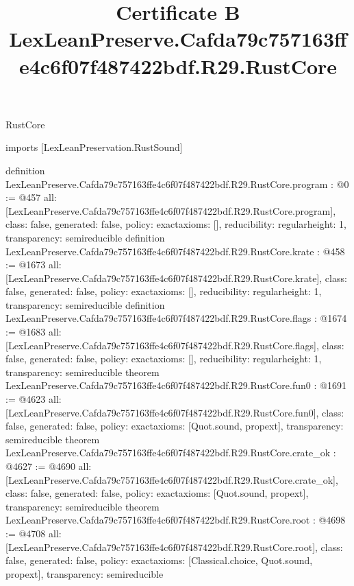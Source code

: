 \begin{lexlean}{RustCore}
\title{Certificate B LexLeanPreserve.Cafda79c757163ffe4c6f07f487422bdf.R29.RustCore}
\begin{coremodule}
imports [LexLeanPreservation.RustSound]

definition LexLeanPreserve.Cafda79c757163ffe4c6f07f487422bdf.R29.RustCore.program : @0 := @457 {
  all: [LexLeanPreserve.Cafda79c757163ffe4c6f07f487422bdf.R29.RustCore.program],
  class: false,
  generated: false,
  policy: exact{axioms: []},
  reducibility: regular{height: 1},
  transparency: semireducible
}
definition LexLeanPreserve.Cafda79c757163ffe4c6f07f487422bdf.R29.RustCore.krate : @458 := @1673 {
  all: [LexLeanPreserve.Cafda79c757163ffe4c6f07f487422bdf.R29.RustCore.krate],
  class: false,
  generated: false,
  policy: exact{axioms: []},
  reducibility: regular{height: 1},
  transparency: semireducible
}
definition LexLeanPreserve.Cafda79c757163ffe4c6f07f487422bdf.R29.RustCore.flags : @1674 := @1683 {
  all: [LexLeanPreserve.Cafda79c757163ffe4c6f07f487422bdf.R29.RustCore.flags],
  class: false,
  generated: false,
  policy: exact{axioms: []},
  reducibility: regular{height: 1},
  transparency: semireducible
}
theorem LexLeanPreserve.Cafda79c757163ffe4c6f07f487422bdf.R29.RustCore.fun0 : @1691 := @4623 {
  all: [LexLeanPreserve.Cafda79c757163ffe4c6f07f487422bdf.R29.RustCore.fun0],
  class: false,
  generated: false,
  policy: exact{axioms: [Quot.sound, propext]},
  transparency: semireducible
}
theorem LexLeanPreserve.Cafda79c757163ffe4c6f07f487422bdf.R29.RustCore.crate_ok : @4627 := @4690 {
  all: [LexLeanPreserve.Cafda79c757163ffe4c6f07f487422bdf.R29.RustCore.crate_ok],
  class: false,
  generated: false,
  policy: exact{axioms: [Quot.sound, propext]},
  transparency: semireducible
}
theorem LexLeanPreserve.Cafda79c757163ffe4c6f07f487422bdf.R29.RustCore.root : @4698 := @4708 {
  all: [LexLeanPreserve.Cafda79c757163ffe4c6f07f487422bdf.R29.RustCore.root],
  class: false,
  generated: false,
  policy: exact{axioms: [Classical.choice, Quot.sound, propext]},
  transparency: semireducible
}


\end{coremodule}
\end{lexlean}
